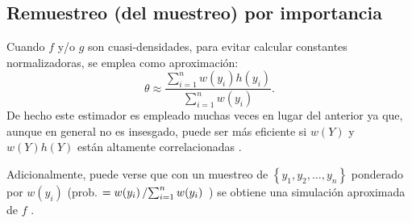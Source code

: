 \documentclass[
  10pt,
]{book}
\theoremstyle{break}
\theoremstyle{nonumberplain}
\begin{document}
\hypertarget{remuestreo-del-muestreo-por-importancia}{%
\subsection{Remuestreo (del muestreo) por importancia}\label{remuestreo-del-muestreo-por-importancia}}

Cuando \(f\) y/o \(g\) son cuasi-densidades, para evitar calcular constantes normalizadoras, se emplea como aproximación:
\[\theta \approx \frac{\sum\limits_{i=1}^n w(y_i) h\left( y_i\right) }{ \sum\limits_{i=1}^n w(y_i)}.\]
De hecho este estimador es empleado muchas veces en lugar del anterior ya que, aunque en general no es insesgado, puede ser más eficiente si \(w(Y)\) y \(w(Y)h(Y)\) están altamente correlacionadas \citep[e.g.][p.35]{liu2004}.

Adicionalmente, puede verse que con un muestreo de \(\left\{y_1, y_2, \ldots, y_n \right\}\) ponderado por \(w(y_i)\) (prob. \(=w(y_i)\left/ \sum\nolimits_{i=1}^n w(y_i) \right.\) ) se obtiene una simulación aproximada de \(f\) \citep[\emph{Sample importance resampling},][]{rubin1987}.
\end{document}
